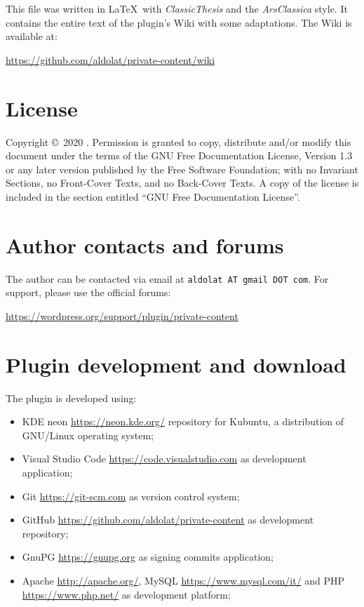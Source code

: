 \begingroup
	\footnotesize

	\noindent This file was written in \LaTeX~with \emph{ClassicThesis} and the
	\emph{ArsClassica} style. It contains the entire text of the plugin's Wiki
	with some adaptations. The Wiki is available at:

	\begin{center}
		\url{https://github.com/aldolat/private-content/wiki}
	\end{center}

	\vfill

	\section*{License}

	Copyright \copyright~2020 \myName.\newline
    \noindent Permission is granted to copy, distribute and/or modify this
    document under the terms of the GNU Free Documentation License, Version 1.3
    or any later version published by the Free Software Foundation; with no
    Invariant Sections, no Front-Cover Texts, and no Back-Cover Texts. A copy of
    the license is included in the section entitled ``GNU Free Documentation
	License''.

	\section*{Author contacts and forums}

	\noindent The author can be contacted via email at \texttt{aldolat AT gmail
	DOT com}.
	For support, please use the official forums:
	\begin{center}
	\url{https://wordpress.org/support/plugin/private-content}
	\end{center}
\endgroup

\newpage

\begingroup

	\footnotesize

	\section*{Plugin development and download}

	\noindent The plugin is developed using:

	\begin{itemize}
		\item KDE neon \url{https://neon.kde.org/} repository for Kubuntu, a
		distribution of GNU/Linux operating system;
		\item Visual Studio Code \url{https://code.visualstudio.com} as
		development application;
		\item Git \url{https://git-scm.com} as version control system;
		\item GitHub \url{https://github.com/aldolat/private-content} as
		development repository;
		\item GnuPG \url{https://gnupg.org} as signing commits application;
		\item Apache \url{http://apache.org/}, MySQL
		\url{https://www.mysql.com/it/} and PHP \url{https://www.php.net/} as
		development platform;
	\end{itemize}

